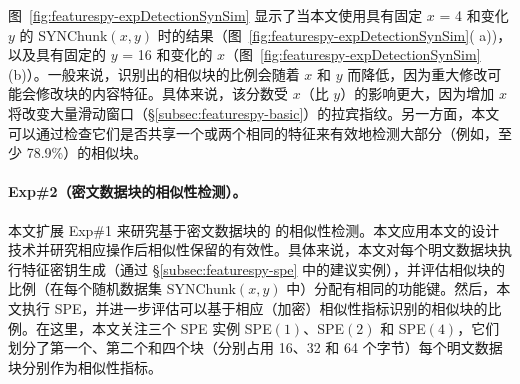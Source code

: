 图~\ref{fig:featurespy-expDetectionSynSim} 显示了当本文使用具有固定 $x$ = 4 和变化 $y$ 的 SYNChunk$(x, y)$ 时的结果（图~\ref{fig:featurespy-expDetectionSynSim}( a))，以及具有固定的 $y$ = 16 和变化的 $x$（图~\ref{fig:featurespy-expDetectionSynSim}(b)）。一般来说，识别出的相似块的比例会随着 $x$ 和 $y$ 而降低，因为重大修改可能会修改块的内容特征。具体来说，该分数受 $x$（比 $y$）的影响更大，因为增加 $x$ 将改变大量滑动窗口（\S\ref{subsec:featurespy-basic}）的拉宾指纹。另一方面，本文可以通过检查它们是否共享一个或两个相同的特征来有效地检测大部分（例如，至少 78.9\%）的相似块。



\paragraph*{Exp\#2（密文数据块的相似性检测）。}
本文扩展 Exp\#1 来研究基于密文数据块的 \sysnameF 的相似性检测。本文应用本文的设计技术并研究相应操作后相似性保留的有效性。具体来说，本文对每个明文数据块执行特征密钥生成（通过 \S\ref{subsec:featurespy-spe} 中的建议实例），并评估相似块的比例（在每个随机数据集 SYNChunk$(x, y)$ 中）分配有相同的功能键。然后，本文执行 SPE，并进一步评估可以基于相应（加密）相似性指标识别的相似块的比例。在这里，本文关注三个 SPE 实例 SPE$(1)$、SPE$(2)$ 和 SPE$(4)$，它们划分了第一个、第二个和四个块（分别占用 16、32 和 64 个字节）每个明文数据块分别作为相似性指标。

